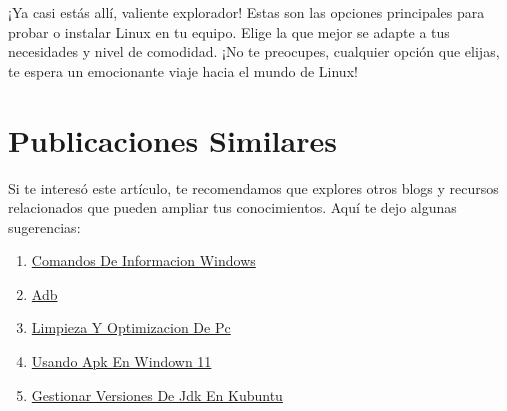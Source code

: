 \documentclass[
  jou,
  floatsintext,
  longtable,
  a4paper,
  nolmodern,
  notxfonts,
  notimes,
  colorlinks=true,linkcolor=blue,citecolor=blue,urlcolor=blue]{apa7}
\providecommand{\tightlist}{%
  \setlength{\itemsep}{0pt}\setlength{\parskip}{0pt}}
\begin{document}
¡Ya casi estás allí, valiente explorador! Estas son las opciones
principales para probar o instalar Linux en tu equipo. Elige la que
mejor se adapte a tus necesidades y nivel de comodidad. ¡No te
preocupes, cualquier opción que elijas, te espera un emocionante viaje
hacia el mundo de Linux!

\section{Publicaciones Similares}\label{publicaciones-similares}

Si te interesó este artículo, te recomendamos que explores otros blogs y
recursos relacionados que pueden ampliar tus conocimientos. Aquí te dejo
algunas sugerencias:

\begin{enumerate}
\def\labelenumi{\arabic{enumi}.}
\tightlist
\item
  \href{https://achalmaedison.netlify.app/tecnologia-seguridad/operating-system/2017-05-21-comandos-de-informacion-windows/index.pdf}{}
  \href{https://achalmaedison.netlify.app/tecnologia-seguridad/operating-system/2017-05-21-comandos-de-informacion-windows}{Comandos
  De Informacion Windows}
\item
  \href{https://achalmaedison.netlify.app/tecnologia-seguridad/operating-system/2019-06-19-adb/index.pdf}{}
  \href{https://achalmaedison.netlify.app/tecnologia-seguridad/operating-system/2019-06-19-adb}{Adb}
\item
  \href{https://achalmaedison.netlify.app/tecnologia-seguridad/operating-system/2021-08-17-limpieza-y-optimizacion-de-pc/index.pdf}{}
  \href{https://achalmaedison.netlify.app/tecnologia-seguridad/operating-system/2021-08-17-limpieza-y-optimizacion-de-pc}{Limpieza
  Y Optimizacion De Pc}
\item
  \href{https://achalmaedison.netlify.app/tecnologia-seguridad/operating-system/2021-10-21-usando-apk-en-windown-11/index.pdf}{}
  \href{https://achalmaedison.netlify.app/tecnologia-seguridad/operating-system/2021-10-21-usando-apk-en-windown-11}{Usando
  Apk En Windown 11}
\item
  \href{https://achalmaedison.netlify.app/tecnologia-seguridad/operating-system/2022-05-12-gestionar-versiones-de-jdk-en-kubuntu/index.pdf}{}
  \href{https://achalmaedison.netlify.app/tecnologia-seguridad/operating-system/2022-05-12-gestionar-versiones-de-jdk-en-kubuntu}{Gestionar
  Versiones De Jdk En Kubuntu}

\end{enumerate}
\end{document}
